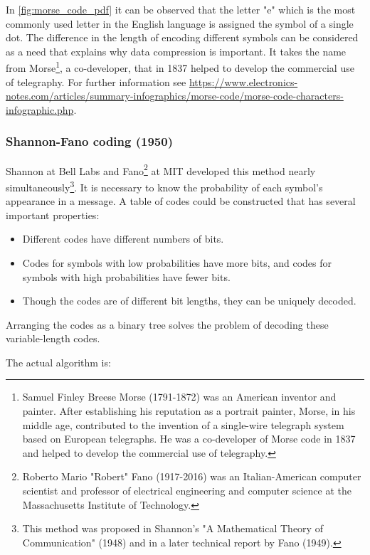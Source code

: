 \documentclass[12pt, a4paper]{report}
\begin{document}
In \autoref{fig:morse_code_pdf} it can be observed that the letter "e" which is the most commonly used letter in the English
language is assigned the symbol of a single dot.
The difference in the length of encoding different symbols can be considered as a need that explains why data compression is
important.
It takes the name from Morse\footnote{Samuel Finley Breese Morse (1791-1872) was an American inventor and painter. After
establishing his reputation as a portrait painter, Morse, in his middle age, contributed to the invention of a single-wire
telegraph system based on European telegraphs. He was a co-developer of Morse code in 1837 and helped to develop the commercial
use of telegraphy.}, a co-developer, that in 1837 helped to develop the commercial use of telegraphy.
For further information see
\url{https://www.electronics-notes.com/articles/summary-infographics/morse-code/morse-code-characters-infographic.php}.

\subsubsection{Shannon-Fano coding (1950)}

Shannon at Bell Labs and Fano\footnote{Roberto Mario "Robert" Fano (1917-2016) was an Italian-American computer scientist and
professor of electrical engineering and computer science at the Massachusetts Institute of Technology.} at MIT developed this
method nearly simultaneously\footnote{This method was proposed in Shannon's "A Mathematical Theory of Communication" (1948) and
in a later technical report by Fano (1949).}.
It is necessary to know the probability of each symbol's appearance in a message.
A table of codes could be constructed that has several important properties:

\begin{itemize}
  \item Different codes have different numbers of bits.
  \item Codes for symbols with low probabilities have more bits, and codes for symbols with high probabilities have fewer bits.
  \item Though the codes are of different bit lengths, they can be uniquely decoded.
\end{itemize}

Arranging the codes as a binary tree solves the problem of decoding these variable-length codes.

The actual algorithm is:
\end{document}
